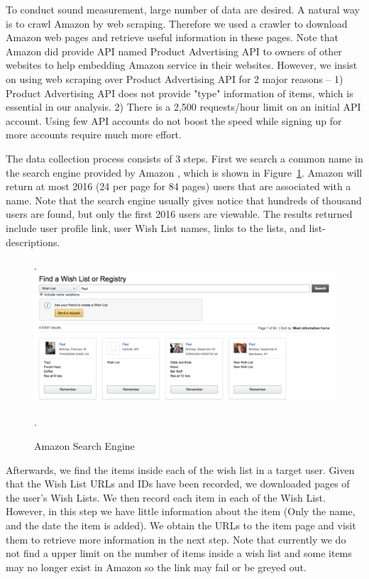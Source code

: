 \documentclass{llncs}
\begin{document}
To conduct sound measurement, large number of data are desired. A natural way is to crawl Amazon by web scraping. Therefore we used a crawler to download Amazon web pages and retrieve useful information in these pages. Note that Amazon did provide API named Product Advertising API to owners of other websites to help embedding Amazon service in their websites. However, we insist on using web scraping over Product Advertising API for 2 major reasons -- 1) Product Advertising API does not provide "type" information of items, which is essential in our analysis. 2) There is a 2,500 requests/hour limit on an initial API account. Using few API accounts do not boost the speed while signing up for more accounts require much more effort.

The data collection process consists of 3 steps.
First we search a common name in the search engine provided by Amazon \cite{searcheng}, which is shown in Figure~\ref{searcheng}. Amazon will return at most 2016 (24 per page for 84 pages) users that are associated with a name. Note that the search engine usually gives notice that hundreds of thousand users are found, but only the first 2016 users are viewable. The results returned include user profile link, user Wish List names, links to the lists, and list-descriptions.

\begin{figure}[H].
\centering
\includegraphics[width=.85\textwidth]{searcheng.png}
\caption{Amazon Search Engine}.
\label{searcheng}
\end{figure}

Afterwards, we find the items inside each of the wish list in a target user. Given that the Wish List URLs and IDs have been recorded, we downloaded pages of the user's Wish Lists. We then record each item in each of the Wish List. However, in this step we have little information about the item (Only the name, and the date the item is added). We obtain the URLs to the item page and visit them to retrieve more information in the next step. Note that currently we do not find a upper limit on the number of items inside a wish list and some items may no longer exist in Amazon so the link may fail or be greyed out. 
\end{document}
